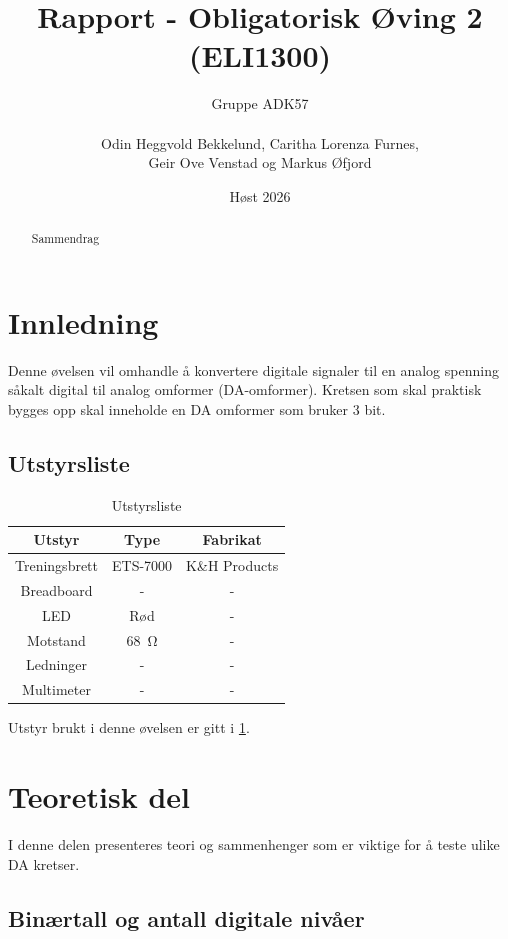 \documentclass[11pt,a4paper,twocolumn]{article}
\title{Rapport - Obligatorisk Øving 2 (ELI1300)}
\author{
	Gruppe ADK57
	\\\\
	Odin Heggvold Bekkelund, Caritha Lorenza Furnes,
	\\
	Geir Ove Venstad og Markus Øfjord
}
\date{Høst 2026}
\begin{document}
\maketitle %

\begin{abstract}
Sammendrag
\end{abstract}


\section{Innledning}
Denne øvelsen vil omhandle å konvertere digitale signaler til en analog spenning såkalt digital til analog omformer (DA-omformer). Kretsen som skal praktisk bygges opp skal inneholde en DA omformer som bruker 3 bit. 

\subsection{Utstyrsliste}

\begin{table}[h]
\caption{Utstyrsliste}
\label{equipment}
\begin{center}
	\begin{tabular}{c|c|c}
		Utstyr & Type & Fabrikat \\
		\hline
		Treningsbrett & ETS-7000 & K\&H Products \\
		Breadboard & - & - \\
		LED & Rød & - \\
		Motstand & \qty{68}{\ohm} & - \\
		Ledninger & - & - \\
		Multimeter & - & - \\
	\end{tabular}
\end{center}
\end{table}

Utstyr brukt i denne øvelsen er gitt i \cref{equipment}.

\section{Teoretisk del}
I denne delen presenteres teori og sammenhenger som er viktige for å teste ulike DA kretser.

\subsection{Binærtall og antall digitale nivåer}
\end{document}
